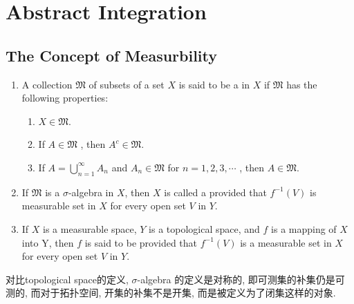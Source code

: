 \documentclass[../main.tex]{subfiles}
\begin{document}
\ifSubfilesClassLoaded{

    \tableofcontents
    
}{}

\chapter{ Abstract Integration }

\section{The Concept of Measurbility}

\begin{definition}{}{}
    \begin{enumerate}
        \item A collection \(  \mathfrak{M}  \) of subsets of a set \(  X  \) is said to be a  in \(  X  \) if \(  \mathfrak{M}  \) has the following properties: \begin{enumerate}
            \item \(  X \in \mathfrak{M}  \). 
            \item If \(  A \in \mathfrak{M}  \)  , then \(  A^{c} \in  \mathfrak{M}  \).
            \item If \(  A =  \bigcup _{n = 1}^{\infty} A_{n}  \) and \(  A_{n} \in  \mathfrak{M}  \) for \(  n = 1,2,3,\cdots   \) , then \(  A \in \mathfrak{M}  \).      
        \end{enumerate}
        \item If \(  \mathfrak{M}  \) is a \(   \sigma   \)-algebra in \(  X  \), then \(  X  \) is called a  provided that \(  f^{-1} \left( V \right)   \) is measurable set in \(  X  \) for every open set \(  V  \) in \(  Y  \).         
        \item If \(  X  \) is a measurable space, \(  Y  \) is a topological space, and \(  f   \) is a mapping of \(  X  \) into Y, then \(  f  \) is said to be  provided that \(  f^{-1} \left( V \right)   \) is a measurable set in \(  X  \) for every open set \(  V  \) in \(  Y  \).          
             
    \end{enumerate}
    
\end{definition}

\begin{note}
    对比topological space的定义, \(   \sigma   \)-algebra 的定义是对称的, 即可测集的补集仍是可测的, 而对于拓扑空间, 开集的补集不是开集, 而是被定义为了闭集这样的对象.
\end{note}
\end{document}
